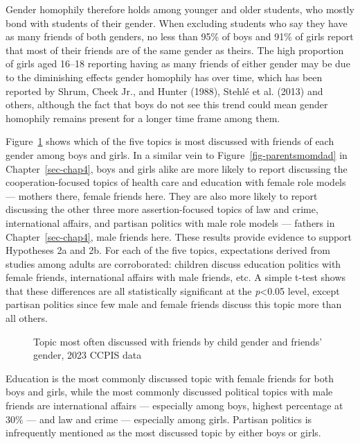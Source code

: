 \documentclass[
  letterpaper,
  DIV=11,
  numbers=noendperiod]{scrreprt}
\begin{document}
Gender homophily therefore holds among younger and older students, who
mostly bond with students of their gender. When excluding students who
say they have as many friends of both genders, no less than 95\% of boys
and 91\% of girls report that most of their friends are of the same
gender as theirs. The high proportion of girls aged 16--18 reporting
having as many friends of either gender may be due to the diminishing
effects gender homophily has over time, which has been reported by
Shrum, Cheek Jr., and Hunter (1988), Stehlé et al. (2013) and others,
although the fact that boys do not see this trend could mean gender
homophily remains present for a longer time frame among them.

Figure~\ref{fig-peers-topics} shows which of the five topics is most
discussed with friends of each gender among boys and girls. In a similar
vein to Figure~\ref{fig-parentsmomdad} in Chapter~\ref{sec-chap4}, boys
and girls alike are more likely to report discussing the
cooperation-focused topics of health care and education with female role
models --- mothers there, female friends here. They are also more likely
to report discussing the other three more assertion-focused topics of
law and crime, international affairs, and partisan politics with male
role models --- fathers in Chapter~\ref{sec-chap4}, male friends here.
These results provide evidence to support Hypotheses 2a and 2b. For each
of the five topics, expectations derived from studies among adults are
corroborated: children discuss education politics with female friends,
international affairs with male friends, etc. A simple t-test shows that
these differences are all statistically significant at the
\emph{p}\textless0.05 level, except partisan politics since few male and
female friends discuss this topic more than all others.

\begin{figure}


\caption{\label{fig-peers-topics}Topic most often discussed with friends
by child gender and friends' gender, 2023 CCPIS data}

\end{figure}%

Education is the most commonly discussed topic with female friends for
both boys and girls, while the most commonly discussed political topics
with male friends are international affairs --- especially among boys,
highest percentage at 30\% --- and law and crime --- especially among
girls. Partisan politics is infrequently mentioned as the most discussed
topic by either boys or girls.
\end{document}
